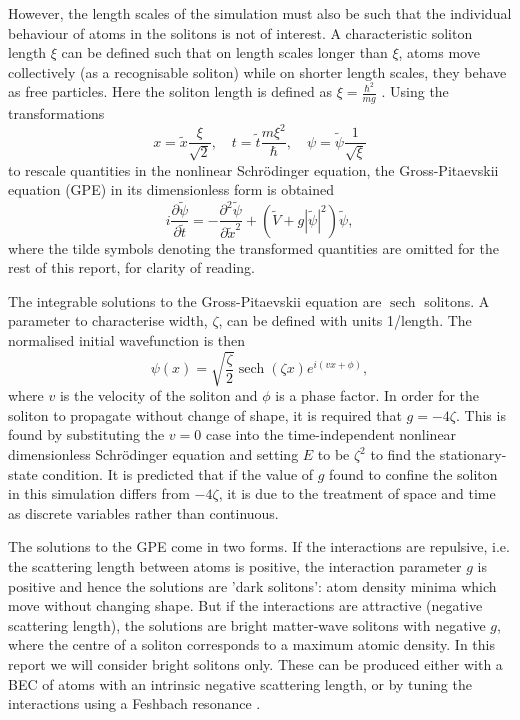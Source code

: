 \documentclass[10pt, twocolumn]{revtex4}    %
\DeclareMathOperator{\sech}{sech}		%
\begin{document}
However, the length scales of the simulation must also be such that the individual behaviour of atoms in the solitons is not of interest. A characteristic soliton length $\xi$ can be defined such that on length scales longer than $\xi$, atoms move collectively (as a recognisable soliton) while on shorter length scales, they behave as free particles. Here the soliton length is defined as $\xi = \frac{\hbar^2}{mg}$ \cite{Cornish}. Using the transformations \cite{Transforms} 
\begin{equation} \label{transforms}
x = \tilde{x} \frac{\xi}{\sqrt{2}}, \quad		 t = \tilde{t} \frac{m \xi^2}{\hbar}, 	\quad \psi = \tilde{\psi} \frac{1}{\sqrt{\xi}}
\end{equation}
to rescale quantities in the nonlinear Schr\"{o}dinger equation, the Gross-Pitaevskii equation (GPE) in its dimensionless form is obtained \cite{Gross} \cite{Pitaevskii}
\begin{equation} \label{GPE}
i \frac{\partial \tilde{\psi}}{\partial \tilde{t}} = -\frac{\partial^2 \tilde{\psi}}{\partial \tilde{x}^2} + (\tilde{V}+g |\tilde{\psi}|^2) \tilde{\psi},
\end{equation}
where the tilde symbols denoting the transformed quantities are omitted for the rest of this report, for clarity of reading. 

The integrable solutions to the Gross-Pitaevskii equation are $\sech$ solitons. A parameter to characterise width, $\zeta$, can be defined with units 1/length. The normalised initial wavefunction is then 
\begin{equation} \label{soliton}
\psi(x) = \sqrt{\frac{\zeta}{2}} \sech{(\zeta x)} e^{i (v x + \phi)},
\end{equation}
where $v$ is the velocity of the soliton and $\phi$ is a phase factor. In order for the soliton to propagate without change of shape, it is required that $g=-4\zeta$. This is found by substituting the $v=0$ case into the time-independent nonlinear dimensionless Schr\"{o}dinger equation and setting $E$ to be $\zeta^2$ to find the stationary-state condition. It is predicted that if the value of $g$ found to confine the soliton in this simulation differs from $-4\zeta$, it is due to the treatment of space and time as discrete variables rather than continuous. 

The solutions to the GPE come in two forms. If the interactions are repulsive, i.e. the scattering length between atoms is positive, the interaction parameter $g$ is positive and hence the solutions are 'dark solitons': atom density minima which move without changing shape. But if the interactions are attractive (negative scattering length), the solutions are bright matter-wave solitons with negative $g$, where the centre of a soliton corresponds to a maximum atomic density. In this report we will consider bright solitons only. These can be produced either with a BEC of atoms with an intrinsic negative scattering length, or by tuning the interactions using a Feshbach resonance \cite{Feshbach}. 
\end{document}
